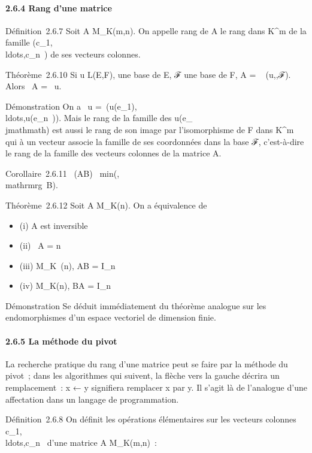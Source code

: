 \documentclass[]{article}
\begin{document}
\paragraph{2.6.4 Rang d'une matrice}

Définition~2.6.7 Soit A \in M_K(m,n). On appelle rang de A le
rang dans K^m de la famille
(c_1,\\ldots,c_n~)
de ses vecteurs colonnes.

Théorème~2.6.10 Si u \in L(E,F),  une base de E, ℱ une base de F, A
= \mathrmMat~ (u,,ℱ). Alors
\mathrmrg~A
= \mathrmrg~u.

Démonstration On a
\mathrmrg~u
=\
\mathrmrg(u(e_1),\\ldots,u(e_n~)).
Mais le rang de la famille des u(e_\\jmathmath) est aussi le rang de son
image par l'isomorphisme de F dans K^m qui à un vecteur
associe la famille de ses coordonnées dans la base ℱ, c'est-à-dire le
rang de la famille des vecteurs colonnes de la matrice A.

Corollaire~2.6.11
\mathrmrg~(AB)
\leq\
min(\mathrmrgA,\\mathrmrg~B).

Théorème~2.6.12 Soit A \in M_K(n). On a équivalence de

\begin{itemize}
\itemsep1pt\parskip0pt
\item
  (i) A est inversible
\item
  (ii) \mathrmrg~A = n
\item
  (iii) \existsB \in M_K~(n), AB =
  I_n
\item
  (iv) \existsB \in M_K(n), BA = I_n~
\end{itemize}

Démonstration Se déduit immédiatement du théorème analogue sur les
endomorphismes d'un espace vectoriel de dimension finie.

\paragraph{2.6.5 La méthode du pivot}

La recherche pratique du rang d'une matrice peut se faire par la méthode
du pivot~; dans les algorithmes qui suivent, la flèche vers la gauche
décrira un remplacement~: x ← y signifiera remplacer x par y. Il s'agit
là de l'analogue d'une affectation dans un langage de programmation.

Définition~2.6.8 On définit les opérations élémentaires sur les vecteurs
colonnes
c_1,\\ldots,c_n~
d'une matrice A \in M_K(m,n)~:
\end{document}
